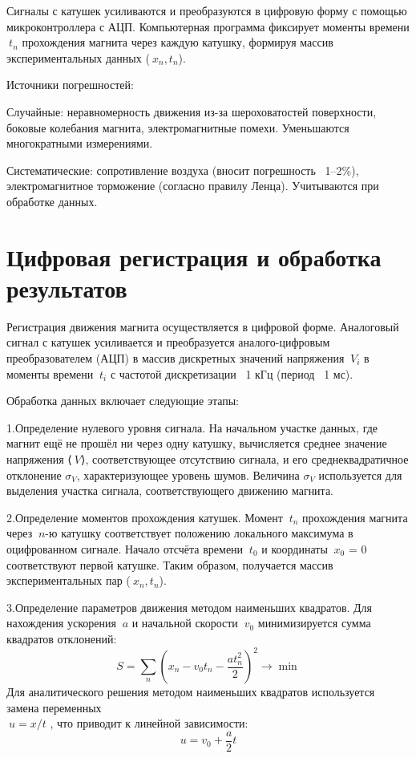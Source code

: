 \documentclass[a4paper, 12pt]{article}
\begin{document}
Сигналы с катушек усиливаются и преобразуются в цифровую форму с помощью микроконтроллера с АЦП. Компьютерная программа фиксирует моменты времени \(\ t_n\) прохождения магнита через каждую катушку, формируя массив экспериментальных данных 
(\(\ x_n,t_n\)).


Источники погрешностей:

Случайные: неравномерность движения из-за шероховатостей поверхности, боковые колебания магнита, электромагнитные помехи. Уменьшаются многократными измерениями.

Систематические: сопротивление воздуха (вносит погрешность {~1–2\%}), электромагнитное торможение (согласно правилу Ленца). Учитываются при обработке данных.

\section{Цифровая регистрация и обработка результатов}
Регистрация движения магнита осуществляется в цифровой форме. Аналоговый сигнал с катушек усиливается и преобразуется аналого-цифровым преобразователем (АЦП) в массив дискретных значений напряжения \(\ V_i\) в моменты времени \(\ t_i\) с частотой дискретизации ~1 кГц (период ~1 мс).

Обработка данных включает следующие этапы:

1.Определение нулевого уровня сигнала.
На начальном участке данных, где магнит ещё не прошёл ни через одну катушку, вычисляется среднее значение напряжения ⟨\(\ V\)⟩, соответствующее отсутствию сигнала, и его среднеквадратичное отклонение \(\sigma_V\), характеризующее уровень шумов. Величина \(\sigma_V\)  используется для выделения участка сигнала, соответствующего движению магнита.

2.Определение моментов прохождения катушек.
Момент \(\ t_n\) прохождения магнита через 
\(\ n\)-ю катушку соответствует положению локального максимума в оцифрованном сигнале. Начало отсчёта времени \(\ t_0\) и координаты \(\ x_0\) = 0 соответствуют первой катушке. Таким образом, получается массив экспериментальных пар 
(\(\ x_n,t_n\)).

3.Определение параметров движения методом наименьших квадратов.
Для нахождения ускорения \(\ a\) и начальной скорости \(\ v_0\) минимизируется сумма квадратов отклонений:
\[
S = \sum_{n} \left( x_n - v_0 t_n - \frac{a t_n^2}{2} \right)^2 \rightarrow \min
\]
Для аналитического решения методом наименьших квадратов используется замена переменных\\ 
\(\ u = x/t \)
, что приводит к линейной зависимости:
\[
u = v_0 + \frac{a}{2} t
\]
\end{document}
